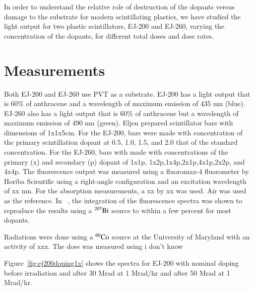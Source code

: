 \documentclass[review]{elsarticle}
\begin{document}
In order to understand the relative role of destruction of the dopants versus damage to the substrate for modern scintillating plastics,
we have studied the light output for two plastic scintillators, EJ-200 and EJ-260, varying the concentration of the dopants, for
different total doses and dose rates.  




\section{Measurements}
Both EJ-200 and EJ-260 use PVT as a substrate.  EJ-200 has a light output that is 60\% of anthracene and a wavelength of maximum emission of 435 nm (blue).  
EJ-260 also has a light output that is 60\% of anthracene but a wavelength of maximum emission of 490 nm (green).  Eljen prepared scintillator bars
with dimensions of 1x1x5cm.  For the EJ-200, bars were made with concentration of the primary scintillation dopant at 0.5, 1.0, 1.5, and 2.0 that of
the standard concentration.  For the EJ-260, bars with made with concentrations of the primary (x) and secondary (p) dopant of 1x1p, 1x2p,1x4p,2x1p,4x1p,2x2p, and 4x4p.
The fluorescence output was measured using a fluoromax-4 fluorometer by Horiba Scientific using a right-angle configuration and an excitation wavelength of
{\color{red} xx} nm.  For the absorption measurements, a {\color{red} xx} by {\color{red} xx} was used.
Air was used as the reference.  In ~\cite{Bross199135}, the integration
of the fluorescence spectra was shown to reproduce the results using a
$\rm{^{207}Bi}$ source to within a few percent for most dopants.

Radiations were done using a ${\rm ^{60}Co}$ source at the University of Maryland with an activity of {\color{red} xxx}.  
The dose was measured using {\color{red} i don't know}

Figure~\ref{fig:ej200doping1x} shows the spectra for EJ-200 with nominal doping before irradiation and after
30 Mrad at 1 Mrad/hr and after 50 Mrad at 1 Mrad/hr.
\end{document}
